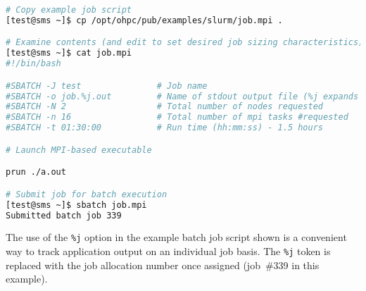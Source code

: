 \begin{lstlisting}[language=bash,keywords={}]
# Copy example job script
[test@sms ~]$ cp /opt/ohpc/pub/examples/slurm/job.mpi .

# Examine contents (and edit to set desired job sizing characteristics)
[test@sms ~]$ cat job.mpi
#!/bin/bash

#SBATCH -J test               # Job name
#SBATCH -o job.%j.out         # Name of stdout output file (%j expands to %jobId)
#SBATCH -N 2                  # Total number of nodes requested
#SBATCH -n 16                 # Total number of mpi tasks #requested
#SBATCH -t 01:30:00           # Run time (hh:mm:ss) - 1.5 hours

# Launch MPI-based executable

prun ./a.out

# Submit job for batch execution
[test@sms ~]$ sbatch job.mpi
Submitted batch job 339
\end{lstlisting}

\begin{center}
\begin{tcolorbox}[]
\small
The use of the \texttt{\%j} option in the example batch job script shown is a convenient
way to track application output on an individual job basis. The \texttt{\%j} token
is replaced with the \SLURM{} job allocation number once assigned (job~\#339 in
this example).
\end{tcolorbox}
\end{center}


